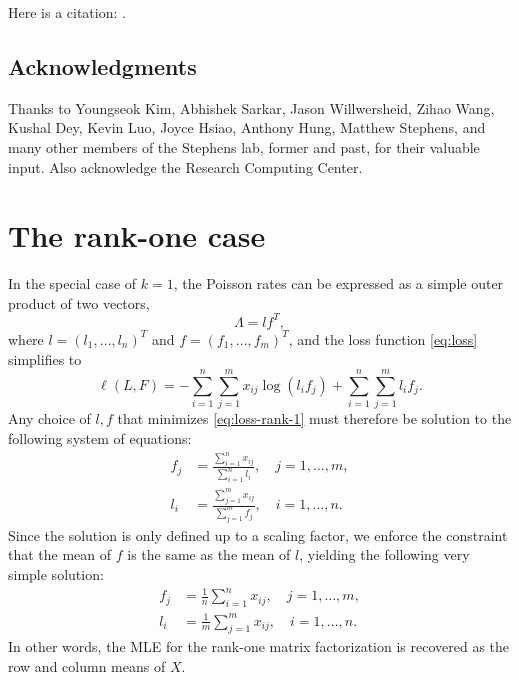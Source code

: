\documentclass[final]{siamart171218}
\begin{document}
Here is a citation: \cite{lee-2001}.

\subsection*{Acknowledgments}

Thanks to Youngseok Kim, Abhishek Sarkar, Jason Willwersheid, Zihao
Wang, Kushal Dey, Kevin Luo, Joyce Hsiao, Anthony Hung, Matthew
Stephens, and many other members of the Stephens lab, former and past,
for their valuable input. Also acknowledge the Research Computing
Center.

\appendix

\section{The rank-one case}
\label{sec:rank-1}
In the special case of $k = 1$, the Poisson rates can be expressed as
a simple outer product of two vectors,
\begin{equation*}
\Lambda = lf^T,  
\end{equation*}
where $l = (l_1, \ldots, l_n)^T$ and $f = (f_1, \ldots, f_m)^T$, and
the loss function \eqref{eq:loss} simplifies to
\begin{equation}
\ell(L,F) = -\sum_{i=1}^n \sum_{j=1}^m x_{ij} \log(l_if_j)
            + \sum_{i=1}^n \sum_{j=1}^m l_i f_j.
\label{eq:loss-rank-1}
\end{equation}
Any choice of $l, f$ that minimizes \eqref{eq:loss-rank-1} must therefore
be solution to the following system of equations:
\begin{align*}
f_j &= \frac{\sum_{i=1}^n x_{ij}}{\sum_{i=1}^n l_i}, 
       \quad j = 1,\ldots,m, \\
l_i &= \frac{\sum_{j=1}^m x_{ij}}{\sum_{j=1}^m f_j}, 
       \quad i = 1,\ldots,n.
\end{align*}
Since the solution is only defined up to a scaling factor, we enforce
the constraint that the mean of $f$ is the same as the mean of $l$,
yielding the following very simple solution:
\begin{align*}
f_j &= \frac{1}{n} \sum_{i=1}^n x_{ij},
       \quad j = 1,\ldots,m, \\
l_i &= \frac{1}{m} \sum_{j=1}^m x_{ij},
       \quad i = 1,\ldots,n.
\end{align*}
In other words, the MLE for the rank-one matrix factorization is
recovered as the row and column means of $X$.



\end{document}
